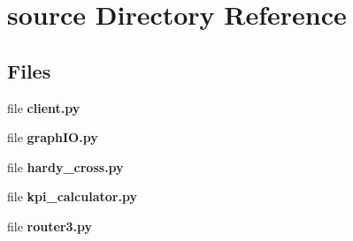 \section{source Directory Reference}
\label{dir_b2f33c71d4aa5e7af42a1ca61ff5af1b}
\subsection*{Files}
\begin{DoxyCompactItemize}
\item 
file \textbf{ client.\+py}
\item 
file \textbf{ graph\+I\+O.\+py}
\item 
file \textbf{ hardy\+\_\+cross.\+py}
\item 
file \textbf{ kpi\+\_\+calculator.\+py}
\item 
file \textbf{ router3.\+py}
\end{DoxyCompactItemize}

